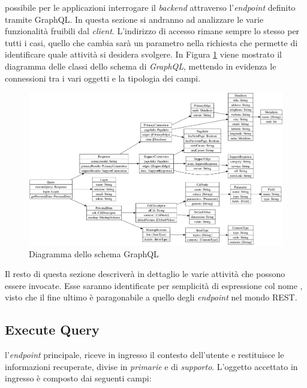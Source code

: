 \upe possibile per le applicazioni interrogare il \emph{backend} attraverso l'\emph{endpoint} definito tramite GraphQL. In questa sezione si andranno ad analizzare le varie funzionalità fruibili dal \emph{client}. L'indirizzo di accesso rimane sempre lo stesso per tutti i casi, quello che cambia sarà un parametro nella richiesta che permette di identificare quale attività si desidera svolgere. In Figura \ref{fig:schema-graphql} viene mostrato il diagramma delle classi dello schema di \emph{GraphQL}, mettendo in evidenza le connessioni tra i vari oggetti e la tipologia dei campi.

\begin{figure}[ht]
	\centering
	\includegraphics[width=\textwidth]{5-implementazione-backend/Immagini/graphql-schema.png}
	\caption{Diagramma dello schema GraphQL}\label{fig:schema-graphql}
\end{figure}

Il resto di questa sezione descriverà in dettaglio le varie attività che possono essere invocate. Esse saranno identificate per semplicità di espressione col nome , visto che il fine ultimo è paragonabile a quello degli \emph{endpoint} nel mondo REST.

\subsection{Execute Query\label{sec:execute-query-endpoint}}

\upe l'\emph{endpoint} principale, riceve in ingresso il contesto dell'utente e restituisce le informazioni recuperate, divise in \emph{primarie} e di \emph{supporto}. L'oggetto accettato in ingresso è composto dai seguenti campi:

